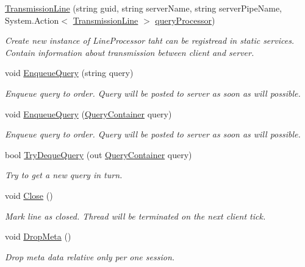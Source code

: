 \begin{DoxyCompactItemize}
\item 
\mbox{\hyperlink{class_pipes_provider_1_1_transmission_line_a20398f48516f0fc5fe0700b01b7fc6d7}{Transmission\+Line}} (string guid, string server\+Name, string server\+Pipe\+Name, System.\+Action$<$ \mbox{\hyperlink{class_pipes_provider_1_1_transmission_line}{Transmission\+Line}} $>$ \mbox{\hyperlink{class_pipes_provider_1_1_transmission_line_a08bf6cb803ea32dd416afcc12ee866f5}{query\+Processor}})
\begin{DoxyCompactList}\small\item\em Create new instance of Line\+Processor taht can be registread in static services. Contain information about transmission between client and server. \end{DoxyCompactList}\item 
void \mbox{\hyperlink{class_pipes_provider_1_1_transmission_line_ac27fedfbe0edfdcb4fbf4509c76f858f}{Enqueue\+Query}} (string query)
\begin{DoxyCompactList}\small\item\em Enqueue query to order. Query will be posted to server as soon as will possible. \end{DoxyCompactList}\item 
void \mbox{\hyperlink{class_pipes_provider_1_1_transmission_line_a59eceb9280548e1c9e662543ee5c96c7}{Enqueue\+Query}} (\mbox{\hyperlink{struct_pipes_provider_1_1_query_container}{Query\+Container}} query)
\begin{DoxyCompactList}\small\item\em Enqueue query to order. Query will be posted to server as soon as will possible. \end{DoxyCompactList}\item 
bool \mbox{\hyperlink{class_pipes_provider_1_1_transmission_line_acc672e0d0c921f60a9a5920e3f76d28b}{Try\+Deque\+Query}} (out \mbox{\hyperlink{struct_pipes_provider_1_1_query_container}{Query\+Container}} query)
\begin{DoxyCompactList}\small\item\em Try to get a new query in turn. \end{DoxyCompactList}\item 
void \mbox{\hyperlink{class_pipes_provider_1_1_transmission_line_a4aa28b1d29a2b0b6fb2af6f046fdf56a}{Close}} ()
\begin{DoxyCompactList}\small\item\em Mark line as closed. Thread will be terminated on the next client tick. \end{DoxyCompactList}\item 
void \mbox{\hyperlink{class_pipes_provider_1_1_transmission_line_a954265d9816b253b75caf7b6b7e1ba86}{Drop\+Meta}} ()
\begin{DoxyCompactList}\small\item\em Drop meta data relative only per one session. \end{DoxyCompactList}\end{DoxyCompactItemize}
